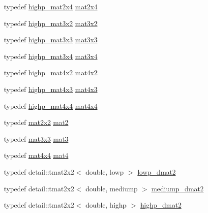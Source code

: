 \begin{CompactItemize}
typedef \hyperlink{group__core__precision_g3cc506666b7a95db56f9d2eb787b6e20}{highp\_\-mat2x4} \hyperlink{group__core__types_ga9bfb36efaf88ecad32369ec8a01d901}{mat2x4}
\item 
typedef \hyperlink{group__core__precision_gbc7767293ff69cd56717ee9d8be62963}{highp\_\-mat3x2} \hyperlink{group__core__types_gd7476e0e866186f12ee87975c6b01552}{mat3x2}
\item 
typedef \hyperlink{group__core__precision_g8a3703cc71cdfc8928eddf46b3763c4b}{highp\_\-mat3x3} \hyperlink{group__core__types_g6fecca6a869070b6bf8acb44ce1c2af3}{mat3x3}
\item 
typedef \hyperlink{group__core__precision_gbaf9c8dd35db715b1093042703f879d0}{highp\_\-mat3x4} \hyperlink{group__core__types_g5524ae15d7fc00a68b8e0e3a0733cc2a}{mat3x4}
\item 
typedef \hyperlink{group__core__precision_gdf9c4a7947c2b0a79f52cc86a860f270}{highp\_\-mat4x2} \hyperlink{group__core__types_g72cf8ec4f4cda85943f4683531e421bc}{mat4x2}
\item 
typedef \hyperlink{group__core__precision_gb8dfe989c5100c35ab5dec0e94f59d2a}{highp\_\-mat4x3} \hyperlink{group__core__types_gd3f3f750dcdc74a9037342c5cae55f5e}{mat4x3}
\item 
typedef \hyperlink{group__core__precision_g231950d260be295a25d7340e2020f55c}{highp\_\-mat4x4} \hyperlink{group__core__types_g63e3ee9447ed593484140a9368e738ec}{mat4x4}
\item 
typedef \hyperlink{group__core__types_geddc14adb4963d9bad73866cc202fb40}{mat2x2} \hyperlink{group__core__types_g8357ec0aab6f8cf69313592492663c3f}{mat2}
\item 
typedef \hyperlink{group__core__types_g6fecca6a869070b6bf8acb44ce1c2af3}{mat3x3} \hyperlink{group__core__types_gdfaff2a7dce5cbf4e77a47ecea42ac5b}{mat3}
\item 
typedef \hyperlink{group__core__types_g63e3ee9447ed593484140a9368e738ec}{mat4x4} \hyperlink{group__core__types_g7dcd2365c2e368e6af5b7adeb6a9c8df}{mat4}
\item 
typedef detail::tmat2x2$<$ double, lowp $>$ \hyperlink{group__core__precision_g5e08c45dfef867e0326a1eee95060cd0}{lowp\_\-dmat2}
\item 
typedef detail::tmat2x2$<$ double, mediump $>$ \hyperlink{group__core__precision_gc056ec9d1c37e591172544088163b7e4}{mediump\_\-dmat2}
\item 
typedef detail::tmat2x2$<$ double, highp $>$ \hyperlink{group__core__precision_g9b158b3b722fe991bb66f7e65f136e68}{highp\_\-dmat2}
\item 

\end{CompactItemize}
